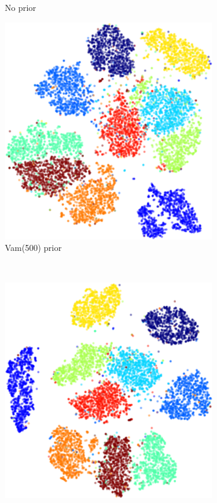 \begin{figure}[h]
\begin{subfigure}[t]{0.3\textwidth}
    \caption{No prior}
\end{subfigure}
\begin{subfigure}[t]{0.3\textwidth}
    \centering
    \includegraphics[width=\textwidth]{img/loracs/mnist/tsne/mnist2-tsne-vamp.png}
    \caption{Vam\p(500) prior}
\end{subfigure}
~
\begin{subfigure}[t]{0.3\textwidth}
    \centering
    \includegraphics[width=\textwidth]{img/loracs/mnist/tsne/mnist2-tsne-maf.png}

\end{subfigure}
\end{figure}
